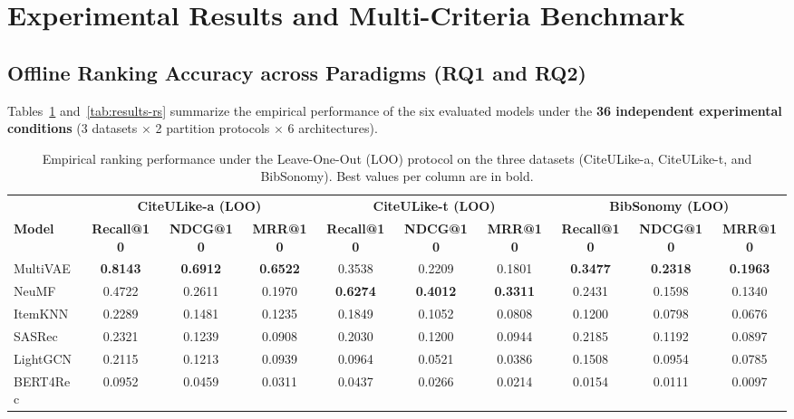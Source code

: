 \documentclass[journal]{IEEEtran}
\makeatletter
\newcommand{\at}[1]{@#1}
\makeatother
\begin{document}
\section{Experimental Results and Multi-Criteria Benchmark}
\label{sec:results}

\subsection{Offline Ranking Accuracy across Paradigms (RQ1 and RQ2)}
Tables~\ref{tab:results-loo} and~\ref{tab:results-rs} summarize the empirical performance of the six evaluated models under the \textbf{36 independent experimental conditions} (3 datasets $\times$ 2 partition protocols $\times$ 6 architectures).

\begin{table}[t]
\centering
\caption{Empirical ranking performance under the Leave-One-Out (LOO) protocol on the three datasets (CiteULike-a, CiteULike-t, and BibSonomy). Best values per column are in bold.}
\label{tab:results-loo}
\footnotesize
\setlength{\tabcolsep}{3.5pt}
\begin{tabular}{lccccccccc}
\toprule
& \multicolumn{3}{c}{\textbf{CiteULike-a (LOO)}} & \multicolumn{3}{c}{\textbf{CiteULike-t (LOO)}} & \multicolumn{3}{c}{\textbf{BibSonomy (LOO)}} \\
\cmidrule(lr){2-4} \cmidrule(lr){5-7} \cmidrule(lr){8-10}
\textbf{Model} & \textbf{Recall\at{10}} & \textbf{NDCG\at{10}} & \textbf{MRR\at{10}} & \textbf{Recall\at{10}} & \textbf{NDCG\at{10}} & \textbf{MRR\at{10}} & \textbf{Recall\at{10}} & \textbf{NDCG\at{10}} & \textbf{MRR\at{10}} \\
\midrule
MultiVAE & \textbf{0.8143} & \textbf{0.6912} & \textbf{0.6522} & 0.3538 & 0.2209 & 0.1801 & \textbf{0.3477} & \textbf{0.2318} & \textbf{0.1963} \\
NeuMF    & 0.4722 & 0.2611 & 0.1970 & \textbf{0.6274} & \textbf{0.4012} & \textbf{0.3311} & 0.2431 & 0.1598 & 0.1340 \\
ItemKNN  & 0.2289 & 0.1481 & 0.1235 & 0.1849 & 0.1052 & 0.0808 & 0.1200 & 0.0798 & 0.0676 \\
SASRec   & 0.2321 & 0.1239 & 0.0908 & 0.2030 & 0.1200 & 0.0944 & 0.2185 & 0.1192 & 0.0897 \\
LightGCN & 0.2115 & 0.1213 & 0.0939 & 0.0964 & 0.0521 & 0.0386 & 0.1508 & 0.0954 & 0.0785 \\
BERT4Rec & 0.0952 & 0.0459 & 0.0311 & 0.0437 & 0.0266 & 0.0214 & 0.0154 & 0.0111 & 0.0097 \\
\bottomrule
\end{tabular}
\end{table}
\end{document}
